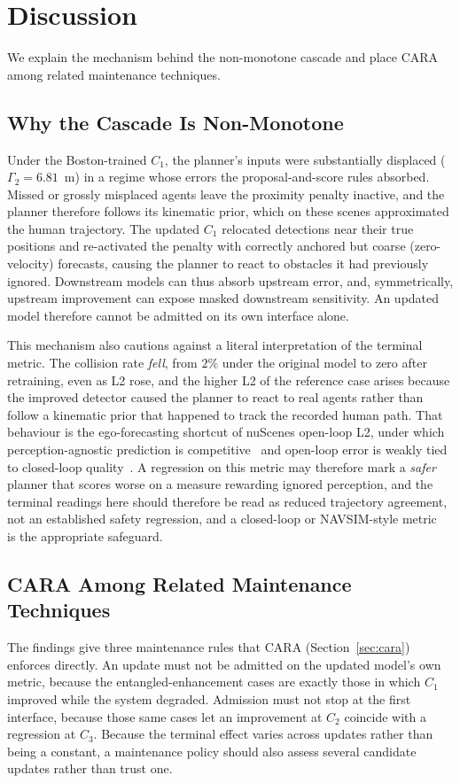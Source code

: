 \documentclass[conference]{IEEEtran}
\begin{document}
\section{Discussion}
\label{sec:implications}
We explain the mechanism behind the non-monotone cascade and place CARA among
related maintenance techniques.

\subsection{Why the Cascade Is Non-Monotone}
Under the Boston-trained $C_1$, the planner's inputs were substantially displaced
($\Gamma_2 = 6.81$~m) in a regime whose errors the proposal-and-score rules
absorbed. Missed or grossly misplaced agents leave the proximity penalty
inactive, and the planner therefore follows its kinematic prior, which on these scenes
approximated the human trajectory. The updated $C_1$ relocated detections near
their true positions and re-activated the penalty with correctly anchored but
coarse (zero-velocity) forecasts, causing the planner to react to obstacles it
had previously ignored. Downstream models can thus absorb upstream error,
and, symmetrically, upstream improvement can expose masked downstream
sensitivity. An updated model therefore cannot be admitted on its own
interface alone.

This mechanism also cautions against a literal interpretation of the terminal
metric. The collision rate \emph{fell}, from $2\%$ under the original model to
zero after retraining, even as L2 rose, and the higher L2 of the reference case
arises because the improved detector caused the planner to react to real agents
rather than follow a kinematic prior that happened to track the recorded human
path. That behaviour is the ego-forecasting shortcut of nuScenes open-loop
L2, under which perception-agnostic prediction is
competitive~\cite{zhai2023rethinking} and open-loop error is weakly tied to
closed-loop quality~\cite{codevilla2018offline}. A regression on this metric may
therefore mark a \emph{safer} planner that scores worse on a measure rewarding
ignored perception, and the terminal readings here should therefore be read as reduced
trajectory agreement, not an established safety regression, and a closed-loop or
NAVSIM-style metric~\cite{dauner2024navsim} is the appropriate safeguard.

\subsection{CARA Among Related Maintenance Techniques}
The findings give three maintenance rules that CARA (Section~\ref{sec:cara})
enforces directly. An update must not be admitted on the updated model's
own metric, because the entangled-enhancement cases are exactly those in
which $C_1$ improved while the system degraded. Admission must not stop at the first
interface, because those same cases let an improvement at $C_2$ coincide with a
regression at $C_3$. Because the terminal effect varies across updates rather than
being a constant, a maintenance policy should also assess several candidate updates
rather
than trust one.
\end{document}
